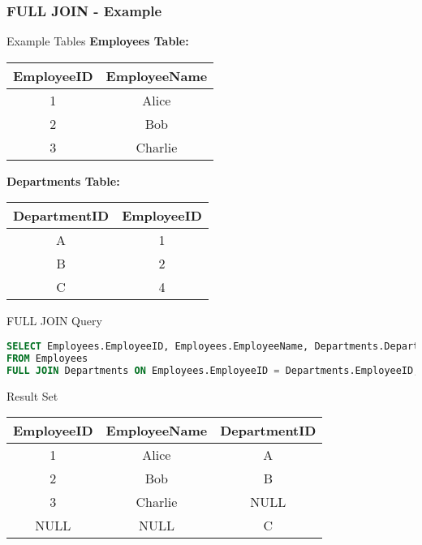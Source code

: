 \documentclass[aspectratio=169]{beamer}
\begin{document}
\begin{frame}[fragile]
    \frametitle{FULL JOIN - Example}
    \begin{block}{Example Tables}
        \textbf{Employees Table:}
        \begin{tabular}{|c|c|}
            \hline
            EmployeeID & EmployeeName \\
            \hline
            1 & Alice \\
            2 & Bob \\
            3 & Charlie \\
            \hline
        \end{tabular}
        
        \vspace{1em}
        
        \textbf{Departments Table:}
        \begin{tabular}{|c|c|}
            \hline
            DepartmentID & EmployeeID \\
            \hline
            A & 1 \\
            B & 2 \\
            C & 4 \\
            \hline
        \end{tabular}
    \end{block}

    \begin{block}{FULL JOIN Query}
    \begin{lstlisting}[language=SQL]
SELECT Employees.EmployeeID, Employees.EmployeeName, Departments.DepartmentID
FROM Employees
FULL JOIN Departments ON Employees.EmployeeID = Departments.EmployeeID;
    \end{lstlisting}
    \end{block}

    \begin{block}{Result Set}
    \begin{tabular}{|c|c|c|}
        \hline
        EmployeeID & EmployeeName & DepartmentID \\
        \hline
        1 & Alice & A \\
        2 & Bob & B \\
        3 & Charlie & NULL \\
        NULL & NULL & C \\
        \hline
    \end{tabular}
    \end{block}
\end{frame}
\end{document}

